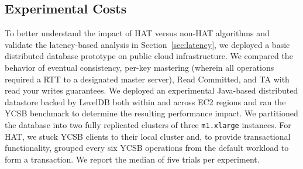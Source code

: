 \subsection{Experimental Costs}

To better understand the impact of HAT versus non-HAT algorithms and
validate the latency-based analysis in Section~\ref{sec:latency}, we
deployed a basic distributed database prototype on public cloud
infrastructure. We compared the behavior of eventual consistency,
per-key mastering (wherein all operations required a RTT to a
designated master server), Read Committed, and TA with read your
writes guarantees. We deployed an experimental Java-based distributed
datastore backed by LevelDB both within and across EC2 regions and ran
the YCSB benchmark to determine the resulting performance impact. We
partitioned the database into two fully replicated clusters of three
\texttt{m1.xlarge} instances. For HAT, we stuck YCSB clients to their
local cluster and, to provide transactional functionality, grouped
every six YCSB operations from the default workload to form a
transaction. We report the median of five trials per experiment.

